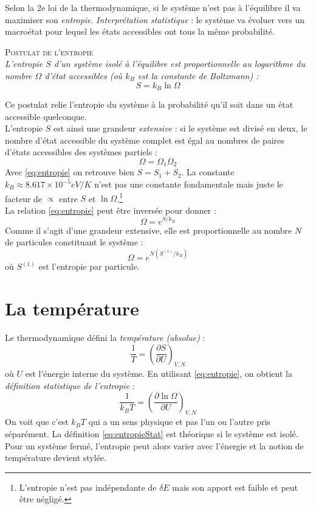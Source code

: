 \documentclass[british,french,11pt, a4paper, openany]{book}
\begin{document}
Selon la 2e loi de la thermodynamique, si le système n'est pas à l'équilibre il va  
maximiser son \textit{entropie}. \textit{Interprétation statistique} : le système va évoluer vers
un macroétat pour lequel les états accessibles ont tous la même probabilité.
\begin{center}
	\textsc{Postulat de l'entropie}\\
	\textit{L'entropie $S$ d'un système isolé à l'équilibre est proportionnelle au logarithme du nombre
		$\Omega$ d'état accessibles (où $k_B$ est la constante de Boltzmann) :}
	\begin{equation}
		S = k_B\ln\Omega
		\label{eq:entropie}
	\end{equation}
\end{center}
Ce postulat relie l'entropie du système à la probabilité qu'il soit dans un état accessible 
quelconque.\\
L'entropie $S$ est ainsi une grandeur \textit{extensive} : si le système est divisé en deux, le 
nombre d'état accessible du système complet est égal au nombres de paires d'états accessibles des
systèmes partiels :
\begin{equation}
	\Omega = \Omega_1\Omega_2
\end{equation}
Avec \autoref{eq:entropie} on retrouve bien $S = S_1+S_2$. La constante $k_B \approx 8.617\times
10^{-5} eV/K$ n'est pas une constante fondamentale mais juste le facteur de $\propto$ entre $S$
et $\ln\Omega$.\footnote{L'entropie n'est pas indépendante de $\delta E$ mais son apport est 
	faible et peut être négligé.}\\

La relation \autoref{eq:entropie} peut être inversée pour donner :
\begin{equation}
	\Omega = e^{S/k_B}
\end{equation}
Comme il s'agit d'une grandeur extensive, elle est proportionnelle au nombre $N$ de particules 
constituant le système :
\begin{equation}
	\Omega = e^{N(S^{(1)}/k_B)}
\end{equation}
où $S^{(1)}$ est l'entropie par particule.


\section{La température}
Le thermodynamique défini la \textit{température (absolue)} :
\begin{equation}
	\frac{1}{T} = \left(\dfrac{\partial S}{\partial U}\right)_{V,N}
\end{equation}
où $U$ est l'énergie interne du système. En utilisant \autoref{eq:entropie}, on obtient la \textit{
	définition statistique de l'entropie} :
\begin{equation}
	\frac{1}{k_BT} = \left(\dfrac{\partial \ln\Omega}{\partial U}\right)_{V,N}
	\label{eq:entropieStat}
\end{equation}
On voit que c'est $k_BT$ qui a un sens physique et pas l'un ou l'autre pris séparément. La 
définition \autoref{eq:entropieStat} est théorique si le système est isolé. Pour un système 
fermé, l'entropie peut alors varier avec l'énergie et la notion de température devient stylée.
\end{document}
